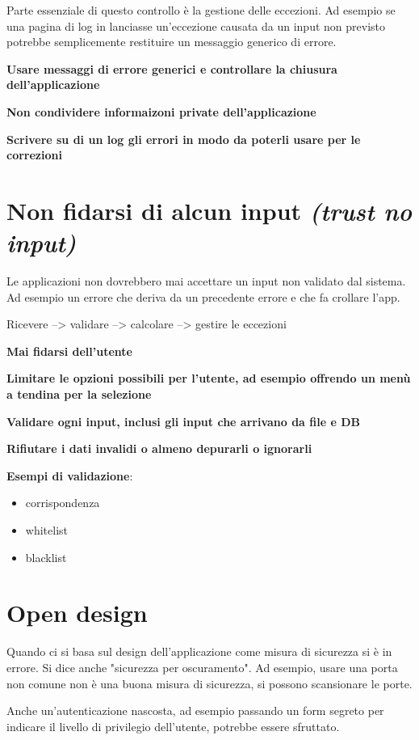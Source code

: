 \documentclass[11pt,a4paper]{book}
\begin{document}
Parte essenziale di questo controllo è la gestione delle eccezioni. Ad esempio se una pagina di log in lanciasse un'eccezione causata da un input non previsto potrebbe semplicemente restituire un messaggio generico di errore. 

\textbf{Usare messaggi di errore generici e controllare la chiusura dell'applicazione}

\textbf{Non condividere informaizoni private dell'applicazione}

\textbf{Scrivere su di un log gli errori in modo da poterli usare per le correzioni}

\section{Non fidarsi di alcun input \textit{(trust no input)}}
Le applicazioni non dovrebbero mai accettare un input non validato dal sistema. Ad esempio un errore che deriva da un precedente errore e che fa crollare l'app.

Ricevere --> validare --> calcolare --> gestire le eccezioni

\textbf{Mai fidarsi dell'utente}

\textbf{Limitare le opzioni possibili per l'utente, ad esempio offrendo un menù a tendina per la selezione}

\textbf{Validare ogni input, inclusi gli input che arrivano da file e DB}

\textbf{Rifiutare i dati invalidi o almeno depurarli o ignorarli}

\textbf{Esempi di validazione}:
\begin{itemize}
	\item corrispondenza
	\item whitelist
	\item blacklist
\end{itemize}


\section{Open design}
Quando ci si basa sul design dell'applicazione come misura di sicurezza si è in errore. Si dice anche "sicurezza per oscuramento". Ad esempio, usare una porta non comune non è una buona misura di sicurezza, si possono scansionare le porte.

Anche un'autenticazione nascosta, ad esempio passando un form segreto per indicare il livello di privilegio dell'utente, potrebbe essere sfruttato.
\end{document}
